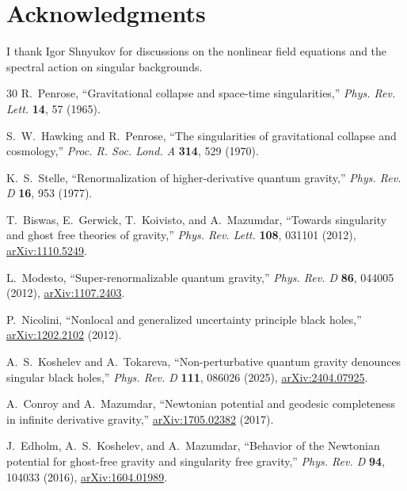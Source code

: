 \documentclass[11pt,a4paper]{article}
\theoremstyle{definition}
\theoremstyle{remark}
\begin{document}
\section*{Acknowledgments}

I thank Igor Shnyukov for discussions on the nonlinear field equations
and the spectral action on singular backgrounds.

\begin{thebibliography}{30}
R.~Penrose, ``Gravitational collapse and space-time singularities,''
\textit{Phys. Rev. Lett.} \textbf{14}, 57 (1965).

S.~W.~Hawking and R.~Penrose, ``The singularities of gravitational collapse
and cosmology,'' \textit{Proc. R. Soc. Lond. A} \textbf{314}, 529 (1970).

K.~S.~Stelle, ``Renormalization of higher-derivative quantum gravity,''
\textit{Phys. Rev. D} \textbf{16}, 953 (1977).

T.~Biswas, E.~Gerwick, T.~Koivisto, and A.~Mazumdar,
``Towards singularity and ghost free theories of gravity,''
\textit{Phys. Rev. Lett.} \textbf{108}, 031101 (2012),
\href{https://arxiv.org/abs/1110.5249}{arXiv:1110.5249}.

L.~Modesto, ``Super-renormalizable quantum gravity,''
\textit{Phys. Rev. D} \textbf{86}, 044005 (2012),
\href{https://arxiv.org/abs/1107.2403}{arXiv:1107.2403}.

P.~Nicolini, ``Nonlocal and generalized uncertainty principle black holes,''
\href{https://arxiv.org/abs/1202.2102}{arXiv:1202.2102} (2012).

A.~S.~Koshelev and A.~Tokareva,
``Non-perturbative quantum gravity denounces singular black holes,''
\textit{Phys. Rev. D} \textbf{111}, 086026 (2025),
\href{https://arxiv.org/abs/2404.07925}{arXiv:2404.07925}.

A.~Conroy and A.~Mazumdar,
``Newtonian potential and geodesic completeness in infinite derivative gravity,''
\href{https://arxiv.org/abs/1705.02382}{arXiv:1705.02382} (2017).

J.~Edholm, A.~S.~Koshelev, and A.~Mazumdar,
``Behavior of the Newtonian potential for ghost-free gravity and singularity free gravity,''
\textit{Phys. Rev. D} \textbf{94}, 104033 (2016),
\href{https://arxiv.org/abs/1604.01989}{arXiv:1604.01989}.


\end{thebibliography}
\end{document}
